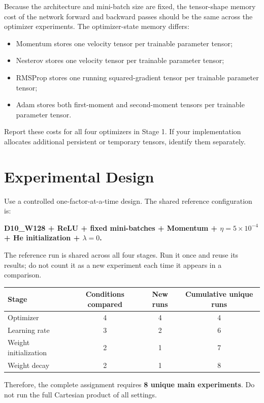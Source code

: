 \documentclass[11pt]{article}
\begin{document}
Because the architecture and mini-batch size are fixed, the tensor-shape memory cost of the network forward and backward passes should be the same across the optimizer experiments. The optimizer-state memory differs:
\begin{itemize}
    \item Momentum stores one velocity tensor per trainable parameter tensor;
    \item Nesterov stores one velocity tensor per trainable parameter tensor;
    \item RMSProp stores one running squared-gradient tensor per trainable parameter tensor;
    \item Adam stores both first-moment and second-moment tensors per trainable parameter tensor.
\end{itemize}

Report these costs for all four optimizers in Stage 1. If your implementation allocates additional persistent or temporary tensors, identify them separately.

\section{Experimental Design}
Use a controlled one-factor-at-a-time design. The shared reference configuration is:

\begin{center}
\textbf{D10\_W128 + ReLU + fixed mini-batches + Momentum + $\eta=5\times10^{-4}$ + He initialization + $\lambda=0$.}
\end{center}

The reference run is shared across all four stages. Run it once and reuse its results; do not count it as a new experiment each time it appears in a comparison.

\begin{center}
\begin{tabular}{lccc}
\toprule
Stage & Conditions compared & New runs & Cumulative unique runs \\
\midrule
Optimizer & 4 & 4 & 4 \\
Learning rate & 3 & 2 & 6 \\
Weight initialization & 2 & 1 & 7 \\
Weight decay & 2 & 1 & 8 \\
\bottomrule
\end{tabular}
\end{center}

Therefore, the complete assignment requires \textbf{8 unique main experiments}. Do not run the full Cartesian product of all settings.
\end{document}
